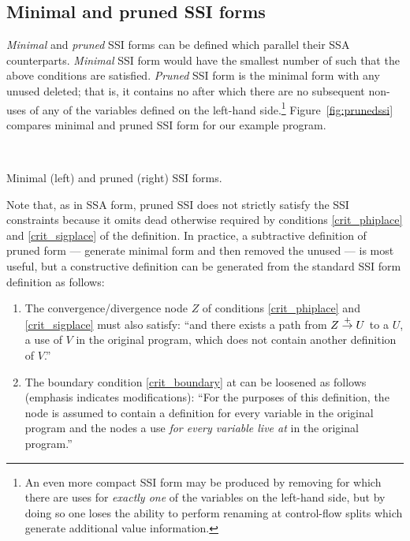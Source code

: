 \documentclass[12pt,titlepage,twoside]{article}
\begin{document}
\subsection{Minimal and pruned SSI forms}
\emph{Minimal} and \emph{pruned} SSI forms can be defined which
parallel their SSA counterparts.  \emph{Minimal} SSI form would have
the smallest number of  such that the above
conditions are satisfied.  \emph{Pruned} SSI form is the minimal form
with any unused  deleted; that is, it contains no
 after which there are no subsequent
non-\phisigfunction[or]{} uses of any of the variables defined on the
left-hand side.\footnote{An even more compact SSI form may be produced
by removing  for which there are uses for \emph{exactly
one} of the variables on the left-hand side, but by doing so one loses
the ability to perform renaming at control-flow splits which generate
additional value information.}  Figure~\vref{fig:prunedssi} compares 
minimal and pruned SSI form for our example program.
\begin{myfigure}
\begin{center}
 \vline\ 
\end{center}
\caption[Minimal and pruned SSI forms.]
{Minimal (left) and pruned (right) SSI forms.}
\label{fig:prunedssi}
\end{myfigure}

Note that, as in SSA form, pruned SSI
does not strictly satisfy the SSI constraints because it omits dead
\phisigfunction{s} otherwise required by conditions \ref{crit_phiplace} and
\ref{crit_sigplace} of the definition.  In practice, a subtractive
definition of pruned form --- generate minimal form and then removed
the unused \phisigfunction{s} --- is most useful, but a constructive
definition can be generated from the standard SSI form definition as
follows:
\begin{enumerate}
\item The convergence/divergence node $Z$ of conditions
\ref{crit_phiplace} and \ref{crit_sigplace} must also satisfy: ``and
there exists a path from $Z\stackrel{+}{\rightarrow} U$ to a $U$, a use of $V$ in the
original program, which does not contain another definition of $V$.''
  \label{amend_place}
\item The boundary condition \ref{crit_boundary} at  can be
loosened as follows (emphasis indicates modifications):
``For the purposes of this definition, the  node is
assumed to contain a definition for every variable in the original
program and the  nodes a use \emph{for every variable live
at \code{END}} in the original program.''
  \label{amend_boundary}
\end{enumerate}
\end{document}
